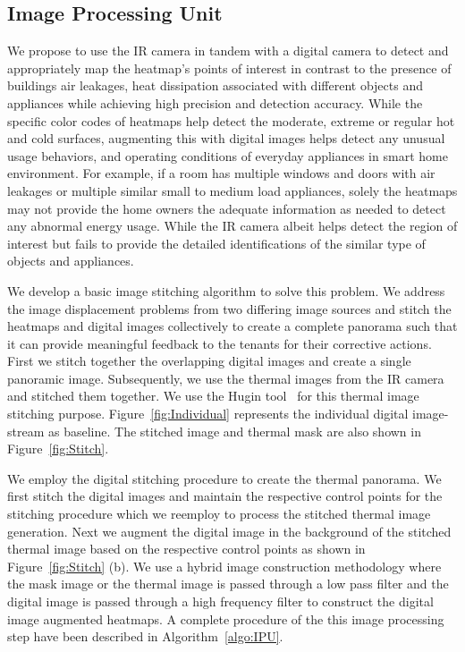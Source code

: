 \documentclass{sig-alternate}
\begin{document}
\subsection{Image Processing Unit}
We propose to use the IR camera in tandem with a digital camera to detect and appropriately map the heatmap's points of interest in contrast to the presence of buildings air leakages, heat dissipation associated with different objects and appliances while achieving high precision and detection accuracy. While the specific color codes of heatmaps help detect the moderate, extreme or regular hot and cold surfaces, augmenting this with digital images helps detect any unusual usage behaviors, and operating conditions of everyday appliances in smart home environment. For example, if a room has multiple windows and doors with air leakages or multiple similar small to medium load appliances, solely the heatmaps may not provide the home owners the adequate information as needed to detect any abnormal energy usage. While the IR camera albeit helps detect the region of interest but fails to provide the detailed identifications of the similar type of objects and appliances.

We develop a basic image stitching algorithm to solve this problem. We address the image displacement problems from two differing image sources and stitch the heatmaps and digital images collectively to create a complete panorama such that it can provide meaningful feedback to the tenants for their corrective actions. First we stitch together the overlapping digital images and create a single panoramic image. Subsequently, we use the thermal images from the IR camera and stitched them together. We use the Hugin tool~\cite{XXXX} for this thermal image stitching purpose. Figure~\ref{fig:Individual} represents the individual digital image-stream as baseline. The stitched image and thermal mask are also shown in Figure~\ref{fig:Stitch}. %

We employ the digital stitching procedure to create the thermal panorama. We first stitch the digital images and maintain the respective control points for the stitching procedure which we reemploy to process the stitched thermal image generation. Next we augment the digital image in the background of the stitched thermal image based on the respective control points as shown in Figure~\ref{fig:Stitch} (b). We use a hybrid image construction methodology where the mask image or the thermal image is passed through a low pass filter and the digital image is passed through a high frequency filter to construct the digital image augmented heatmaps. A complete procedure of the this image processing step have been described in Algorithm~\ref{algo:IPU}.
\end{document}
